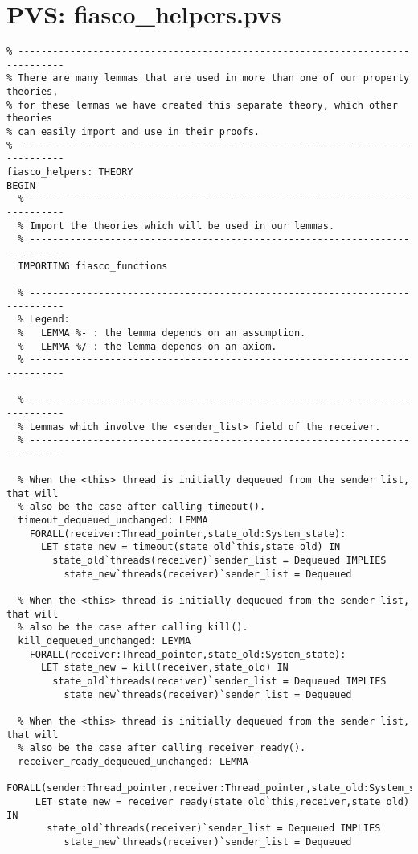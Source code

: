 \hypertarget{pvs_fiasco_helpers}{\chapter{PVS: fiasco\_helpers.pvs}}
\lstset{language=PVS}
\begin{lstlisting}
% ------------------------------------------------------------------------------
% There are many lemmas that are used in more than one of our property theories,
% for these lemmas we have created this separate theory, which other theories 
% can easily import and use in their proofs.
% ------------------------------------------------------------------------------
fiasco_helpers: THEORY
BEGIN
  % ----------------------------------------------------------------------------
  % Import the theories which will be used in our lemmas.
  % ----------------------------------------------------------------------------
  IMPORTING fiasco_functions  

  % ----------------------------------------------------------------------------
  % Legend:
  %   LEMMA %- : the lemma depends on an assumption.
  %   LEMMA %/ : the lemma depends on an axiom.
  % ----------------------------------------------------------------------------

  % ----------------------------------------------------------------------------
  % Lemmas which involve the <sender_list> field of the receiver.
  % ----------------------------------------------------------------------------

  % When the <this> thread is initially dequeued from the sender list, that will
  % also be the case after calling timeout().
  timeout_dequeued_unchanged: LEMMA
    FORALL(receiver:Thread_pointer,state_old:System_state):
      LET state_new = timeout(state_old`this,state_old) IN
        state_old`threads(receiver)`sender_list = Dequeued IMPLIES
          state_new`threads(receiver)`sender_list = Dequeued

  % When the <this> thread is initially dequeued from the sender list, that will
  % also be the case after calling kill().
  kill_dequeued_unchanged: LEMMA
    FORALL(receiver:Thread_pointer,state_old:System_state):
      LET state_new = kill(receiver,state_old) IN
        state_old`threads(receiver)`sender_list = Dequeued IMPLIES
          state_new`threads(receiver)`sender_list = Dequeued

  % When the <this> thread is initially dequeued from the sender list, that will
  % also be the case after calling receiver_ready().
  receiver_ready_dequeued_unchanged: LEMMA
   FORALL(sender:Thread_pointer,receiver:Thread_pointer,state_old:System_state):
     LET state_new = receiver_ready(state_old`this,receiver,state_old) IN
       state_old`threads(receiver)`sender_list = Dequeued IMPLIES
          state_new`threads(receiver)`sender_list = Dequeued


\end{lstlisting}
